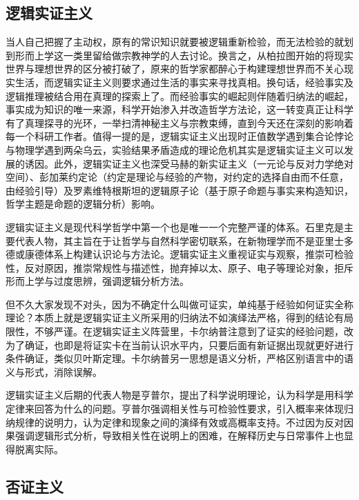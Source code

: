 \documentclass[]{tufte-book}
\begin{document}
\hypertarget{ux903bux8f91ux5b9eux8bc1ux4e3bux4e49}{%
\subsection{逻辑实证主义}\label{ux903bux8f91ux5b9eux8bc1ux4e3bux4e49}}

当人自己把握了主动权，原有的常识知识就要被逻辑重新检验，而无法检验的就划到形而上学这一类里留给做宗教神学的人去讨论。换言之，从柏拉图开始的将现实世界与理想世界的区分被打破了，原来的哲学家都醉心于构建理想世界而不关心现实生活，而逻辑实证主义则要求通过生活的事实来寻找真相。换句话，经验事实及逻辑推理被结合用在真理的探索上了。而经验事实的崛起则伴随着归纳法的崛起，事实成为知识的唯一来源，科学开始渗入并改造哲学方法论，这一转变真正让科学有了真理探寻的光环，一举扫清神秘主义与宗教束缚，直到今天还在深刻的影响着每一个科研工作者。值得一提的是，逻辑实证主义出现时正值数学遇到集合论悖论与物理学遇到两朵乌云，实验结果矛盾造成的理论危机其实是逻辑实证主义可以发展的诱因。此外，逻辑实证主义也深受马赫的新实证主义（一元论与反对力学绝对空间）、彭加莱约定论（约定是理论与经验的产物，对约定的选择自由而不任意，由经验引导）及罗素维特根斯坦的逻辑原子论（基于原子命题与事实来构造知识，哲学主题是命题的逻辑分析）影响。

逻辑实证主义是现代科学哲学中第一个也是唯一一个完整严谨的体系。石里克是主要代表人物，其主旨在于让哲学与自然科学密切联系，在新物理学而不是亚里士多德或康德体系上构建认识论与方法论。逻辑实证主义重视证实与观察，推崇可检验性，反对原因，推崇常规性与描述性，抛弃掉以太、原子、电子等理论对象，拒斥形而上学与过度思辨，强调逻辑分析方法。

但不久大家发现不对头，因为不确定什么叫做可证实，单纯基于经验如何证实全称理论？本质上就是逻辑实证主义所采用的归纳法不如演绎法严格，得到的结论有局限性，不够严谨。在逻辑实证主义阵营里，卡尔纳普注意到了证实的经验问题，改为了确证，也即是将证实卡在当前认识水平内，只要后面有新证据出现就更好进行条件确证，类似贝叶斯定理。卡尔纳普另一思想是语义分析，严格区别语言中的语义与形式，消除误解。

逻辑实证主义后期的代表人物是亨普尔，提出了科学说明理论，认为科学是用科学定律来回答为什么的问题。亨普尔强调相关性与可检验性要求，引入概率来体现归纳规律的说明力，认为定律和现象之间的演绎有效或高概率支持。不过因为反对因果强调逻辑形式分析，导致相关性在说明上的困难，在解释历史与日常事件上也显得脱离实际。

\hypertarget{ux5426ux8bc1ux4e3bux4e49}{%
\subsection{否证主义}\label{ux5426ux8bc1ux4e3bux4e49}}
\end{document}
